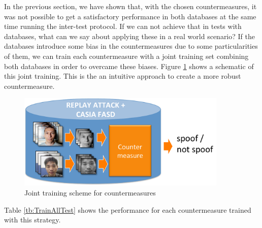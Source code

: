 In the previous section, we have shown that, with the chosen countermeasures, it was not possible to get a satisfactory performance in both databases at the same time running the inter-test protocol. If we can not achieve that in tests with databases, what can we say about applying these in a real world scenario? If the databases introduce some bias in the countermeasures due to some particularities of them, we can train each countermeasure with a joint training set combining both databases in order to overcame these biases. Figure \ref{img:joint_training} shows a schematic of this joint training. This is the an intuitive approach to create a more robust countermeasure.

\begin{figure}[!htb]
\begin{center}
\includegraphics [width=10cm] {images/joint_training.pdf}
\caption{Joint training scheme for countermeasures} \label{img:joint_training}
\end{center}
\end{figure}



Table \ref{tb:TrainAllTest} shows the performance for each countermeasure trained with this strategy. %

